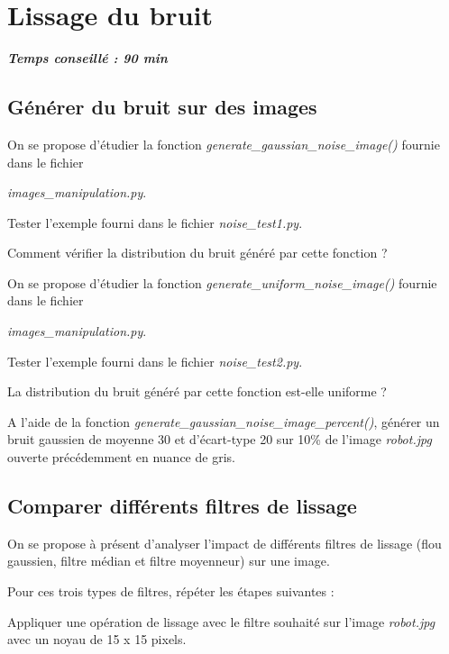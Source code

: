 \documentclass[a4paper,11pt,titlepage]{article} %
\begin{document}
\newpage
\section{Lissage du bruit}

\begin{center} \textbf{\textit{Temps conseillé : 90 min}} \end{center}

\subsection{Générer du bruit sur des images}

On se propose d'étudier la fonction \textsl{generate\_gaussian\_noise\_image()} fournie dans le fichier 

\textsl{images\_manipulation.py}.

\Manip Tester l'exemple fourni dans le fichier \textsl{noise\_test1.py}.

\Quest Comment vérifier la distribution du bruit généré par cette fonction ?

\medskip

On se propose d'étudier la fonction \textsl{generate\_uniform\_noise\_image()} fournie dans le fichier 

\textsl{images\_manipulation.py}.

\Manip Tester l'exemple fourni dans le fichier \textsl{noise\_test2.py}.

\Quest La distribution du bruit généré par cette fonction est-elle uniforme ?

\Manip A l'aide de la fonction \textsl{generate\_gaussian\_noise\_image\_percent()}, générer un bruit gaussien de moyenne 30 et d'écart-type 20 sur 10\% de l'image \textsl{robot.jpg} ouverte précédemment en nuance de gris. 


\subsection{Comparer différents filtres de lissage}

On se propose à présent d'analyser l'impact de différents filtres de lissage  (flou gaussien, filtre médian et filtre moyenneur) sur une image.

Pour ces trois types de filtres, répéter les étapes suivantes :

\Manip Appliquer une opération de lissage avec le filtre souhaité sur l'image \textsl{robot.jpg} avec un noyau de 15 x 15 pixels.
\end{document}
